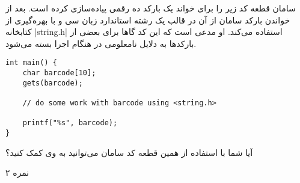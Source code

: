
سامان قطعه کد زیر را برای خواند یک بارکد ده رقمی پیاده‌سازی کرده است. بعد از خواندن بارکد سامان از آن در قالب یک رشته استاندارد زبان سی و با بهره‌گیری از کتابخانه |string.h| استفاده می‌کند.
او مدعی است که این کد گاها برای بعضی از بارکدها به دلایل نامعلومی در هنگام اجرا بسته می‌شود.

\begin{latin}
\begin{verbatim}
int main() {
    char barcode[10];
    gets(barcode);

    // do some work with barcode using <string.h>

    printf("%s", barcode);
}
\end{verbatim}
\end{latin}

آیا شما با استفاده از همین قطعه کد سامان می‌توانید به وی کمک کنید؟

۲ نمره


